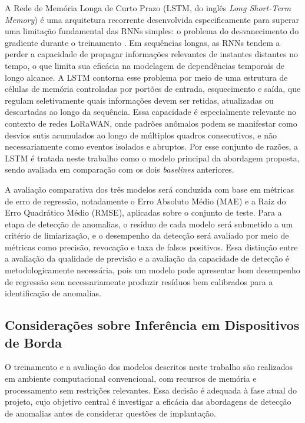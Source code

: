 A Rede de Memória Longa de Curto Prazo (LSTM, do inglês 
\textit{Long Short-Term Memory}) é uma arquitetura recorrente desenvolvida 
especificamente para superar uma limitação fundamental das RNNs simples: o 
problema do desvanecimento do gradiente durante o treinamento 
\cite{hochreiter1997}. Em sequências longas, as RNNs tendem a perder a 
capacidade de propagar informações relevantes de instantes distantes no 
tempo, o que limita sua eficácia na modelagem de dependências temporais de 
longo alcance. A LSTM contorna esse problema por meio de uma estrutura de 
células de memória controladas por portões de entrada, esquecimento e saída, 
que regulam seletivamente quais informações devem ser retidas, atualizadas 
ou descartadas ao longo da sequência. Essa capacidade é especialmente 
relevante no contexto de redes LoRaWAN, onde padrões anômalos podem se 
manifestar como desvios sutis acumulados ao longo de múltiplos quadros 
consecutivos, e não necessariamente como eventos isolados e abruptos. Por 
esse conjunto de razões, a LSTM é tratada neste trabalho como o modelo 
principal da abordagem proposta, sendo avaliada em comparação com os dois 
\textit{baselines} anteriores.

A avaliação comparativa dos três modelos será conduzida com base em métricas 
de erro de regressão, notadamente o Erro Absoluto Médio (MAE) e a Raiz do 
Erro Quadrático Médio (RMSE), aplicadas sobre o conjunto de teste. Para a 
etapa de detecção de anomalias, o resíduo de cada modelo será submetido a 
um critério de limiarização, e o desempenho da detecção será avaliado por 
meio de métricas como precisão, revocação e taxa de falsos positivos. Essa 
distinção entre a avaliação da qualidade de previsão e a avaliação da 
capacidade de detecção é metodologicamente necessária, pois um modelo pode 
apresentar bom desempenho de regressão sem necessariamente produzir resíduos 
bem calibrados para a identificação de anomalias.


\subsection{Considerações sobre Inferência em Dispositivos de Borda}

O treinamento e a avaliação dos modelos descritos neste trabalho são 
realizados em ambiente computacional convencional, com recursos de memória e 
processamento sem restrições relevantes. Essa decisão é adequada à fase 
atual do projeto, cujo objetivo central é investigar a eficácia das 
abordagens de detecção de anomalias antes de considerar questões de 
implantação.

